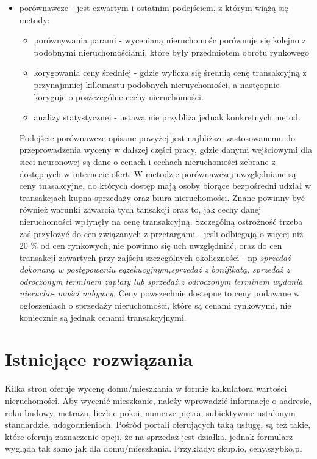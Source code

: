 \documentclass[a4paper,12pt,twoside,openany]{report}
\begin{document}
\begin{itemize}
\item porównawcze - jest czwartym i ostatnim podejściem, z którym wiążą się metody: 
\begin{itemize}
\item porównywania parami - wycenianą nieruchomośc porównuje się kolejno z podobnymi nieruchomościami, które były przedmiotem obrotu rynkowego
\item korygowania ceny średniej - gdzie wylicza się średnią cenę transakcyjną z przynajmniej kilkunastu podobnych nieruychomości, a nastęopnie koryguje o poszczególne cechy nieruchomości.
\item  analizy statystycznej - ustawa nie przybliża jednak konkretnych metod.
\end{itemize}


Podejście porównawcze opisane powyżej jest najbliższe zastosowanemu do przeprowadzenia wyceny w dalszej części pracy, gdzie danymi wejściowymi dla sieci neuronowej są dane o  cenach i cechach nieruchomości zebrane z dostępnych w internecie ofert. 
W metodzie porównawczej uwzględniane są ceny tnasakcyjne, do których dostęp mają osoby biorące bezpośredni udział w transakcjach kupna-sprzedaży oraz biura nieruchomości. Znane powinny być również warunki zawarcia tych tansakcji  oraz to, jak cechy danej nieruchomości wpłynęły na cenę transakcyjną. Szczególną ostrożność trzeba zaś przyłożyć do cen związanych z przetargami - jesli odbiegają o więcej niż 20 \% od cen rynkowych, nie powinno się uch uwzględniać, oraz do cen transakcji zawartych przy zajściu szczególnych okoliczności - np \textit{sprzedaż dokonaną w postępowaniu egzekucyjnym,sprzedaż z bonifikatą, sprzedaż z odroczonym terminem zapłaty lub sprzedaż z odroczonym terminem wydania nierucho-
mości nabywcy.}
Ceny powszechnie dostepne to ceny podawane w ogłoszeniach o sprzedaży nieruchomości, które są cenami rynkowymi, nie koniecznie są jednak cenami transakcyjnymi.

\end {itemize}

\section {Istniejące rozwiązania}
Kilka stron oferuje wycenę domu/mieszkania w formie kalkulatora wartości nieruchomości. Aby wycenić mieszkanie, należy wprowadzić informacje o aadresie, roku budowy, metrażu, liczbie pokoi, numerze piętra, subiektywnie ustalonym standardzie, udogodnieniach. Pośród portali oferujących taką usługę, są też takie, które oferują zaznaczenie opcji, że na sprzedaż jest działka, jednak formularz wygląda tak samo jak dla domu/mieszkania.
Przykłady: skup.io, ceny.szybko.pl 
\end{document}
